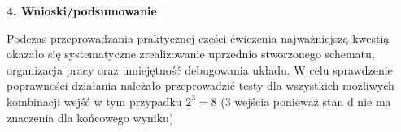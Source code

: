 \documentclass[12pt,a4paper]{report}
\begin{document}
	
	\vspace{0.5cm}
	{\large\bfseries 4. Wnioski/podsumowanie\\}
	
	Podczas przeprowadzania praktycznej części ćwiczenia najważniejszą kwestią okazało się systematyczne zrealizowanie uprzednio stworzonego schematu, organizacja pracy oraz umiejętność debugowania układu. W celu sprawdzenie poprawności działania należało przeprowadzić testy dla wszystkich możliwych kombinacji wejść w tym przypadku $2^3 = 8$ (3 wejścia ponieważ stan d nie ma znaczenia dla końcowego wyniku)
	
\end{document}
